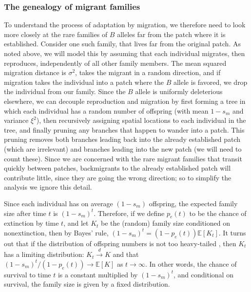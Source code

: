 \documentclass{article}
\newcommand{\E}{\mathbb{E}}
\newcommand{\dconv}{\xrightarrow{d}}
\begin{document}
\subsubsection{The genealogy of migrant families}

To understand the process of adaptation by migration,
we therefore need to look more closely at the rare families of $B$ alleles far from the patch where it is established.
Consider one such family,
that lives far from the original patch.
As noted above, we will model this by assuming that each individual
migrates, then reproduces, independently of all other family members.
The mean squared migration distance is $\sigma^2$, takes the migrant in a random direction,
and if migration takes the individual into a patch where the $B$ allele is favored, 
we drop the individual from our family.
Since the $B$ allele is uniformly deleterious elsewhere,
we can decouple reproduction and migration
by first forming a tree in which each individual has a random number of offspring
(with mean $1-s_m$ and variance $\xi^2$),
then recursively assigning spatial locations to each individual in the tree,
and finally pruning any branches that happen to wander into a patch.
This pruning removes both branches leading back into the already established patch (which are irrelevant)
and branches leading into the new patch (we will need to count these).
Since we are concerned with the rare migrant families that transit quickly between patches, 
backmigrants to the already established patch will contribute little, since they are going the wrong direction;
so to simplify the analysis we ignore this detail.  %



Since each individual has on average $(1-s_m)$ offspring,
the expected family size after time $t$ is $(1-s_m)^t$.
Therefore, if we define $p_e(t)$ to be the chance of extinction by time $t$, 
and let $K_t$ be the (random) family size conditioned on nonextinction,
then by Bayes' rule, $(1-s_m)^t = (1-p_e(t))\E[K_t]$.
It turns out that if the distribution of offspring numbers is not too heavy-tailed \citep[see][for details]{jagers1975branching},
then $K_t$ has a limiting distribution: $K_t \dconv K$ 
and that $(1-s_m)^{t}/(1-p_e(t)) \to \E[K]$ as $t \to \infty$.
In other words, the chance of survival to time $t$ is a constant multiplied by $(1-s_m)^t$,
and conditional on survival, the family size is given by a fixed distribution.
\end{document}
